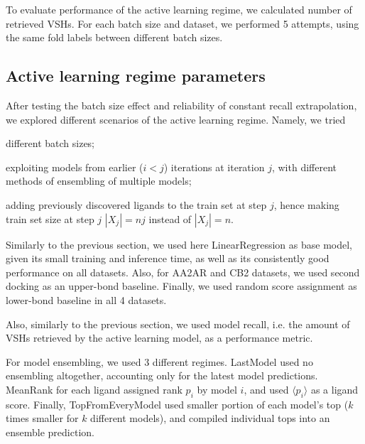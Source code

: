 To evaluate performance of the active learning regime, we calculated number of retrieved VSHs. For each batch size and dataset, we performed 5 attempts, using the same fold labels between different batch sizes.

\subsection{Active learning regime parameters}

After testing the batch size effect and reliability of constant recall extrapolation, we explored different scenarios of the active learning regime. Namely, we tried
\begin{enumerate*}[label=(\roman*)]
    \item different batch sizes;
    \item exploiting models from earlier ($i < j$) iterations at iteration $j$, with different methods of ensembling of multiple models;
    \item adding previously discovered ligands to the train set at step $j$, hence making train set size at step $j$ $|X_j| = nj$ instead of $|X_j|=n$.    
\end{enumerate*}

Similarly to the previous section, we used here LinearRegression as base model, given its small training and inference time, as well as its consistently good performance on all datasets. Also, for AA2AR and CB2 datasets, we used second docking as an upper-bond baseline. Finally, we used random score assignment as lower-bond baseline in all 4 datasets. 

Also, similarly to the previous section, we used model recall, i.e. the amount of VSHs retrieved by the active learning model, as a performance metric.

For model ensembling, we used 3 different regimes. LastModel used no ensembling altogether, accounting only for the latest model predictions. MeanRank for each ligand assigned rank $p_i$ by model $i$, and used $\langle p_i \rangle$ as a ligand score. Finally, TopFromEveryModel used smaller portion of each model's top ($k$ times smaller for $k$ different models), and compiled individual tops into an ensemble prediction.




